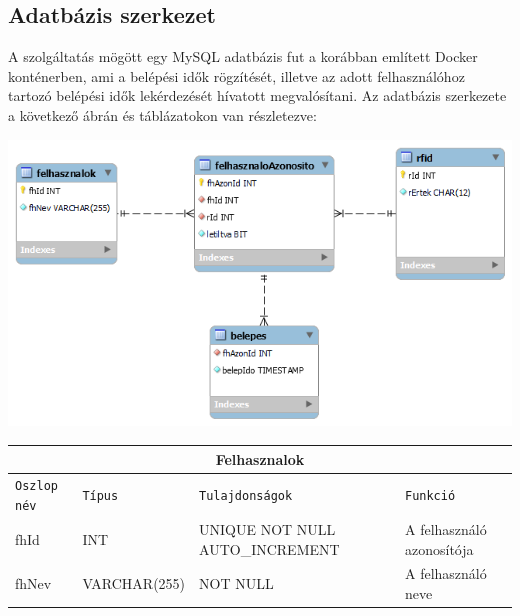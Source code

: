 \documentclass[11pt, a4paper]{article}
\begin{document}
		\subsection{Adatbázis szerkezet}
			\begin{flushleft}
				\justifying
				A szolgáltatás mögött egy MySQL adatbázis fut a korábban említett Docker konténerben, ami a belépési idők rögzítését, illetve az adott felhasználóhoz tartozó belépési idők lekérdezését hívatott megvalósítani. Az adatbázis szerkezete a következő ábrán és táblázatokon van részletezve: \\
			\end{flushleft}
			\begin{minipage}{\linewidth}
				\centering
				\includegraphics[width=0.9\linewidth]{../db/db_diagram}
				\label{fig:dbdiagram}
			\end{minipage}
			\vfill
				\begin{minipage}{\linewidth}
					\fontsize{10}{16}\selectfont
					\centering
					\begin{tabular}{||m{6em} m{6.5em} m{10em} m{12em}||}
						\hline
						\multicolumn{4}{|c|}{\textbf{Felhasznalok}} \\
						\hline
						\texttt{Oszlop név} & \texttt{Típus} & \texttt{Tulajdonságok} & \texttt{Funkció} \\ 
						\hline\hline
						fhId & INT & UNIQUE NOT NULL AUTO\_INCREMENT & A felhasználó azonosítója \\ 
						\hline
						fhNev & VARCHAR(255) & NOT NULL & A felhasználó neve \\
						\hline
					\end{tabular}
					\label{table:1}
				\end{minipage}
				\vfill
				
\end{document}
